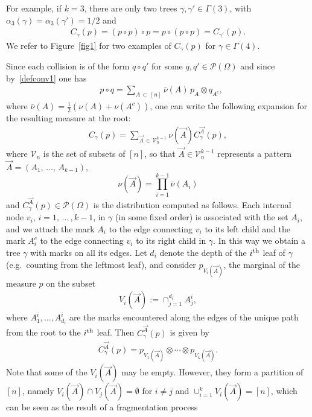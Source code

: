 \documentclass[AHL,Unicode,longabstracts,published]{cedram}
\newcommand{\cP}{\mathcal{P}}
\newcommand{\cV}{\mathcal{V}}
\let\a=\alpha
\let\g=\gamma
\let\G=\Gamma
\let\O=\Omega
\begin{document}
For example, if $k=3$, there are only two trees $\g,\g'\in\G(3)$, with $\a_3(\g)=\a_3(\g')=1/2$ and
\begin{align}\label{eq2}
C_{\gamma}(p)=(p \circ p)\circ p=p\circ(p \circ p)= C_{\gamma'}(p).
\end{align}
We refer to Figure~\ref{fig1} for two examples of $C_{\gamma}(p)$ for $\g\in\G(4)$.


Since each collision is of the form $q\circ q'$ for some $q,q'\in\cP(\O)$ and since by~\eqref{defconv1} one has
\begin{align}\label{lab:nons}
&p \circ q = \sum_{A\,\subset\,[n]}\bar\nu(A)\,p_A \otimes q_{A^c},
\end{align}
where $\bar\nu(A)= \frac12(\nu(A)+\nu(A^c))$, one can write the following expansion for the resulting measure at the root:
\begin{align}\label{eq5}
C_{\gamma}(p)= \sum_{\vec A\,\in\,\cV_n^{k-1}}\nu(\vec A) C^{\vec A}_{\gamma}(p),
\end{align}
where $\cV_n$ is the set of subsets of $[n]$, so that $\vec A\in \cV_n^{k-1}$ represents a pattern $\vec A=(A_1,\,\dots,\,A_{k-1})$,
\begin{equation}\label{eq:nua}
\nu(\vec A)= \prod_{i=1}^{k-1}\bar\nu(A_i)
\end{equation}
and $C^{\vec A}_{\gamma}(p)\in\cP(\O)$ is the distribution computed as follows. Each internal node $v_i$, $i=1,\,\dots\,,k-1$, in $\gamma$ (in some fixed order) is associated with the set $A_i$, and we attach the mark $A_i$ to the edge connecting $v_i$ to its left child and the mark $A_i^c$ to the edge connecting $v_i$ to its right child in $\gamma$. In this way we obtain a tree $\gamma$ with marks on all its edges. Let $d_i$ denote the depth of the $i^{\rm th}$ leaf of $\gamma$ (e.g.\ counting from the leftmost leaf), and consider $p_{V_i(\vec A)}$, the marginal of the measure $p$ on the subset
\begin{align}\label{eqa5}
V_i(\vec A):=\cap_{j=1}^{d_i} A^i_j,
\end{align}
where $A^i_1,\dots,A^i_{d_i}$ are the marks encountered along the edges of the unique path from the root to the $i^{\rm th}$ leaf. Then $ C^{\vec A}_{\gamma}(p)$ is given by
\begin{align}\label{eq6}
C^{\vec A}_{\gamma}(p) = p_{V_1(\vec A)}\otimes\cdots\otimes p_{V_k(\vec A)}.
\end{align}
Note that some of the $V_i(\vec A)$ may be empty. However, they form a partition of $[n]$, namely $V_i(\vec A)\cap V_j(\vec A)=\emptyset$ for $i\neq j$ and $\cup_{i=1}^kV_i(\vec A)=[n]$, which can be seen as the result of a fragmentation process
\end{document}
